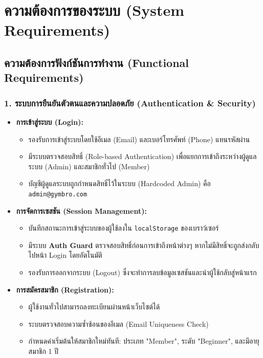 \section{ความต้องการของระบบ (System Requirements)}

\subsection{ความต้องการฟังก์ชันการทำงาน (Functional Requirements)}

\subsubsection{1. ระบบการยืนยันตัวตนและความปลอดภัย (Authentication \& Security)}
\begin{itemize}
    \item \textbf{การเข้าสู่ระบบ (Login):}
    \begin{itemize}
        \item รองรับการเข้าสู่ระบบโดยใช้อีเมล (Email) และเบอร์โทรศัพท์ (Phone) แทนรหัสผ่าน
        \item มีระบบตรวจสอบสิทธิ์ (Role-based Authentication) เพื่อแยกการเข้าถึงระหว่างผู้ดูแลระบบ (Admin) และสมาชิกทั่วไป (Member)
        \item บัญชีผู้ดูแลระบบถูกกำหนดสิทธิ์ไว้ในระบบ (Hardcoded Admin) คือ \texttt{admin@gymbro.com}
    \end{itemize}
    \item \textbf{การจัดการเซสชัน (Session Management):}
    \begin{itemize}
        \item บันทึกสถานะการเข้าสู่ระบบของผู้ใช้ลงใน \texttt{localStorage} ของเบราว์เซอร์
        \item มีระบบ \textbf{Auth Guard} ตรวจสอบสิทธิ์ก่อนการเข้าถึงหน้าต่างๆ หากไม่มีสิทธิ์จะถูกส่งกลับไปหน้า Login โดยอัตโนมัติ
        \item รองรับการออกจากระบบ (Logout) ซึ่งจะทำการลบข้อมูลเซสชันและนำผู้ใช้กลับสู่หน้าแรก
    \end{itemize}
    \item \textbf{การสมัครสมาชิก (Registration):}
    \begin{itemize}
        \item ผู้ใช้งานทั่วไปสามารถลงทะเบียนผ่านหน้าเว็บไซต์ได้
        \item ระบบตรวจสอบความซ้ำซ้อนของอีเมล (Email Uniqueness Check)
        \item กำหนดค่าเริ่มต้นให้สมาชิกใหม่ทันที: ประเภท "Member", ระดับ "Beginner", และมีอายุสมาชิก 1 ปี
    \end{itemize}
\end{itemize}

